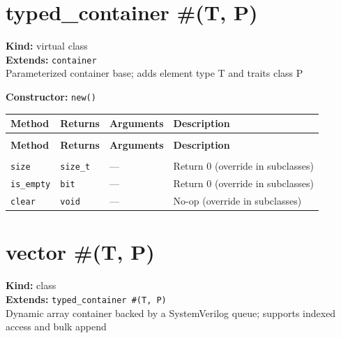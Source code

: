 \documentclass[11pt,letterpaper]{report}
\begin{document}
\section{typed\_container \#(T, P)}
\label{cls:typedcontainerTP}

\noindent\textbf{Kind:} virtual class\\
\noindent\textbf{Extends:} \texttt{container}\\
\noindent Parameterized container base; adds element type T and traits class P

\noindent\textbf{Constructor:} \texttt{new()}

\begin{xltabular}{\linewidth}{>{\small}p{1.35in} >{\small}p{1.25in} >{\small}p{0.95in} >{\small}X}
\toprule
\textbf{Method} & \textbf{Returns} & \textbf{Arguments} & \textbf{Description} \\
\midrule
\endfirsthead
{} \\
\midrule
\textbf{Method} & \textbf{Returns} & \textbf{Arguments} & \textbf{Description} \\
\midrule
\endhead
\midrule
{} \\
\endfoot
\bottomrule
\endlastfoot
\texttt{size} & \texttt{size\_t} & --- & Return 0 (override in subclasses) \\
\texttt{is\_empty} & \texttt{bit} & --- & Return 0 (override in subclasses) \\
\texttt{clear} & \texttt{void} & --- & No-op (override in subclasses) \\
\end{xltabular}

\section{vector \#(T, P)}
\label{cls:vectorTP}

\noindent\textbf{Kind:} class\\
\noindent\textbf{Extends:} \texttt{typed\_container \#(T, P)}\\
\noindent Dynamic array container backed by a SystemVerilog queue; supports indexed access and bulk append
\end{document}
